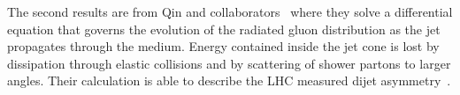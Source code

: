 
The second results are from Qin and
collaborators~\cite{Qin:2010mn,qin_privatecomm} where they solve a
differential equation that governs the evolution of the radiated gluon
distribution as the jet propagates through the medium.  Energy
contained inside the jet cone is lost by dissipation through elastic
collisions and by scattering of shower partons to larger angles.
Their calculation is able to describe the LHC measured dijet
asymmetry~\cite{Qin:2010mn}.  



